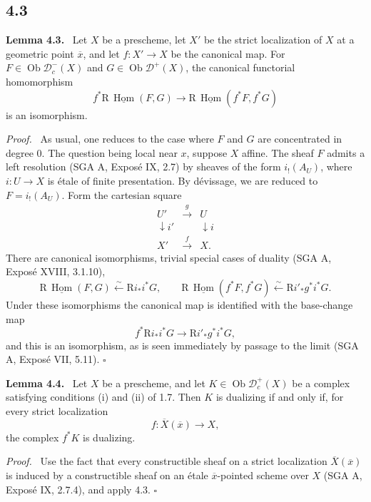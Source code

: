 \documentclass[11pt]{article}
\theoremstyle{plain}
\theoremstyle{definition}
\theoremstyle{remark}
\newenvironment{statement}[1]{\par\medskip\noindent\textbf{#1.}\ }{\par\medskip}
\newenvironment{prooftext}{\par\noindent\textit{Proof.}\ }{\par\medskip}
\newcommand{\D}{\mathcal D}\newcommand{\E}{\mathcal E}\newcommand{\F}{\mathcal F}
\DeclareMathOperator{\Hom}{Hom}
\DeclareMathOperator{\ob}{Ob}
\newcommand{\ol}[1]{\overline{#1}}
\newcommand{\R}{\mathrm R}
\newcommand{\qedtext}{\hfill$\square$}
\begin{document}
\subsection*{4.3}
\begin{statement}{Lemma 4.3}
Let $X$ be a prescheme, let $X'$ be the strict localization of $X$ at a geometric point $\ol x$, and let $f:X'\to X$ be the canonical map. For $F\in\ob\D_c^-(X)$ and $G\in\ob\D^+(X)$, the canonical functorial homomorphism
\[
   f^*\R\,\underline{\Hom}(F,G)
      \longrightarrow
   \R\,\underline{\Hom}(f^*F,f^*G)
\]
is an isomorphism.
\end{statement}

\begin{prooftext}
As usual, one reduces to the case where $F$ and $G$ are concentrated in degree $0$. The question being local near $x$, suppose $X$ affine. The sheaf $F$ admits a left resolution (SGA A, Exposé IX, 2.7) by sheaves of the form $i_!(A_U)$, where $i:U\to X$ is étale of finite presentation. By dévissage, we are reduced to $F=i_!(A_U)$. Form the cartesian square
\[
\begin{array}{ccc}
 U'&\xrightarrow{g}&U\\
 \downarrow i'&&\downarrow i\\
 X'&\xrightarrow{f}&X.
\end{array}
\]
There are canonical isomorphisms, trivial special cases of duality (SGA A, Exposé XVIII, 3.1.10),
\[
   \R\,\underline{\Hom}(F,G)\xleftarrow{\sim}\R i_*i^*G,
   \qquad
   \R\,\underline{\Hom}(f^*F,f^*G)\xleftarrow{\sim}\R i'_*g^*i^*G.
\]
Under these isomorphisms the canonical map is identified with the base-change map
\[
   f^*\R i_*i^*G\longrightarrow \R i'_*g^*i^*G,
\]
and this is an isomorphism, as is seen immediately by passage to the limit (SGA A, Exposé VII, 5.11). \qedtext
\end{prooftext}

\begin{statement}{Lemma 4.4}
Let $X$ be a prescheme, and let $K\in\ob\D_c^+(X)$ be a complex satisfying conditions (i) and (ii) of 1.7. Then $K$ is dualizing if and only if, for every strict localization
\[
   f:\ol X(\ol x)\longrightarrow X,
\]
the complex $f^*K$ is dualizing.
\end{statement}

\begin{prooftext}
Use the fact that every constructible sheaf on a strict localization $\ol X(\ol x)$ is induced by a constructible sheaf on an étale $\ol x$-pointed scheme over $X$ (SGA A, Exposé IX, 2.7.4), and apply 4.3. \qedtext
\end{prooftext}
\end{document}
